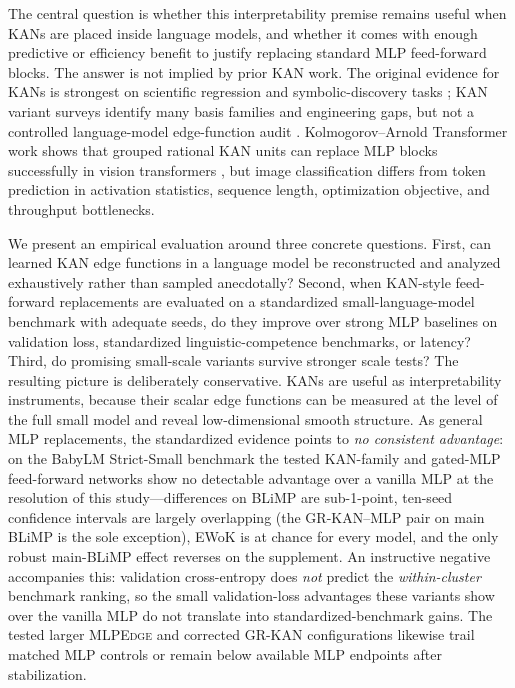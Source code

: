 \documentclass{article}
\newcommand{\modelname}[1]{\textsc{#1}}
\newcommand{\grkan}{\modelname{GR-KAN}}
\newcommand{\mlpedge}{\modelname{MLPEdge}}
\begin{document}
The central question is whether this interpretability premise remains useful when KANs are placed inside language models, and whether it comes with enough predictive or efficiency benefit to justify replacing standard MLP feed-forward blocks. The answer is not implied by prior KAN work. The original evidence for KANs is strongest on scientific regression and symbolic-discovery tasks \citep{liu2024kan,liu2024kan2}; KAN variant surveys identify many basis families and engineering gaps, but not a controlled language-model edge-function audit \citep{somvanshi2024survey,noorizadegan2025practitioners}. Kolmogorov--Arnold Transformer work shows that grouped rational KAN units can replace MLP blocks successfully in vision transformers \citep{yang2024kat}, but image classification differs from token prediction in activation statistics, sequence length, optimization objective, and throughput bottlenecks.

We present an empirical evaluation around three concrete questions. First, can learned KAN edge functions in a language model be reconstructed and analyzed exhaustively rather than sampled anecdotally? Second, when KAN-style feed-forward replacements are evaluated on a standardized small-language-model benchmark with adequate seeds, do they improve over strong MLP baselines on validation loss, standardized linguistic-competence benchmarks, or latency? Third, do promising small-scale variants survive stronger scale tests? The resulting picture is deliberately conservative. KANs are useful as interpretability instruments, because their scalar edge functions can be measured at the level of the full small model and reveal low-dimensional smooth structure. As general MLP replacements, the standardized evidence points to \emph{no consistent advantage}: on the BabyLM Strict-Small benchmark the tested KAN-family and gated-MLP feed-forward networks show no detectable advantage over a vanilla MLP at the resolution of this study---differences on BLiMP are sub-1-point, ten-seed confidence intervals are largely overlapping (the \grkan{}--MLP pair on main BLiMP is the sole exception), EWoK is at chance for every model, and the only robust main-BLiMP effect reverses on the supplement. An instructive negative accompanies this: validation cross-entropy does \emph{not} predict the \emph{within-cluster} benchmark ranking, so the small validation-loss advantages these variants show over the vanilla MLP do not translate into standardized-benchmark gains. The tested larger \mlpedge{} and corrected \grkan{} configurations likewise trail matched MLP controls or remain below available MLP endpoints after stabilization.
\end{document}
